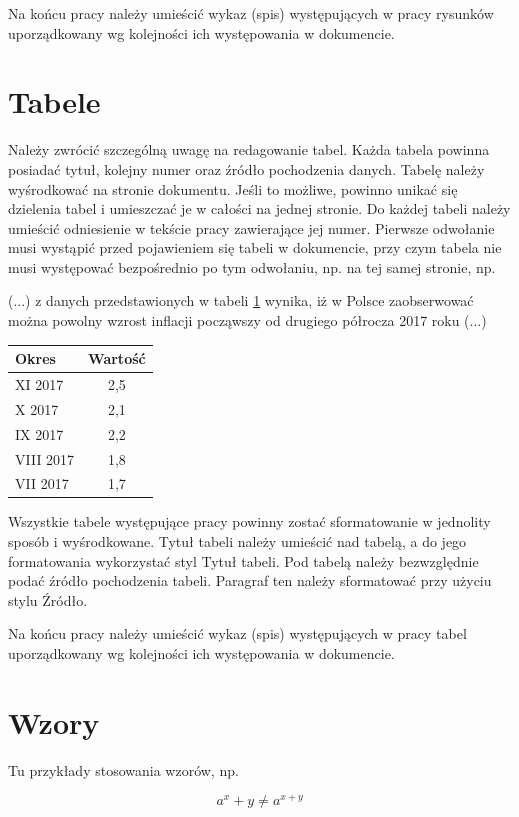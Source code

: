 Na końcu pracy należy umieścić wykaz (spis) występujących w pracy rysunków uporządkowany wg kolejności ich występowania w dokumencie.



\section{Tabele}

Należy zwrócić szczególną uwagę na redagowanie tabel. Każda tabela powinna posiadać tytuł, kolejny numer oraz źródło pochodzenia danych. Tabelę należy wyśrodkować na stronie dokumentu. Jeśli to możliwe, powinno unikać się dzielenia tabel i umieszczać je w całości na jednej stronie. Do każdej tabeli należy umieścić odniesienie w tekście pracy zawierające jej numer. Pierwsze odwołanie musi wystąpić przed pojawieniem się tabeli w dokumencie, przy czym tabela nie musi występować bezpośrednio po tym odwołaniu, np. na tej samej stronie, np.

(...) z danych przedstawionych w tabeli \ref{tab:inflacja} wynika, iż w Polsce zaobserwować można powolny wzrost inflacji począwszy od drugiego półrocza 2017 roku (...)

\begin{table}[ht]
	\label{tab:inflacja}
	\centering
	\begin{tabular}{ l c }
		\hline
		\textbf{Okres}  &  \textbf{Wartość} \\ \hline
		XI 2017         &  2,5 \\
		X 2017          &  2,1 \\
		IX 2017         &  2,2 \\
		VIII 2017       &  1,8 \\
		VII 2017        &  1,7 \\ \hline
	\end{tabular}
	
\end{table}

 Wszystkie tabele występujące pracy powinny zostać sformatowanie w jednolity sposób i wyśrodkowane. Tytuł tabeli należy umieścić nad tabelą, a do jego formatowania wykorzystać styl Tytuł tabeli. Pod tabelą należy bezwzględnie podać źródło pochodzenia tabeli. Paragraf ten należy sformatować przy użyciu stylu Źródło.


Na końcu pracy należy umieścić wykaz (spis) występujących w pracy tabel uporządkowany wg kolejności ich występowania w dokumencie.



\section{Wzory}

Tu przykłady stosowania wzorów, np.

\begin{equation}
a^x+y \neq a^{x+y}
\end{equation}





